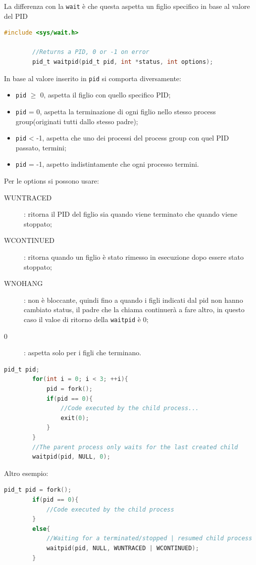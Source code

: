 \documentclass[a4paper, 12pt]{book}
\begin{document}
    La differenza con la \verb|wait| è che questa aspetta un figlio 
    specifico in base al valore del PID
    \begin{lstlisting}[language=C]
        #include <sys/wait.h>

        //Returns a PID, 0 or -1 on error
        pid_t waitpid(pid_t pid, int *status, int options);
    \end{lstlisting}
    In base al valore inserito in \verb|pid| si comporta diversamente:
    \begin{itemize}
        \item \verb|pid| $\ge$ 0, aspetta il figlio con quello specifico PID;
        \item \verb|pid| = 0, aspetta la terminazione di ogni figlio nello stesso process group(originati tutti dallo stesso padre);
        \item \verb|pid| < -1, aspetta che uno dei processi del process group con quel PID passato, termini;
        \item \verb|pid| = -1, aspetto indistintamente che ogni processo termini.
    \end{itemize}
    Per le options si possono usare:
    \begin{description}
        \item[WUNTRACED]: ritorna il PID del figlio sia quando viene terminato che quando viene stoppato;
        \item[WCONTINUED]: ritorna quando un figlio è stato rimesso in esecuzione dopo essere stato stoppato;
        \item[WNOHANG]: non è bloccante, quindi fino a quando i figli indicati dal pid non hanno cambiato status, il padre che la chiama continuerà a fare altro, in questo caso il valoe di ritorno della \verb|waitpid| è 0;
        \item[0]: aspetta solo per i figli che terminano.    
    \end{description}
    \begin{lstlisting}[language=C]
        pid_t pid;
        for(int i = 0; i < 3; ++i){
            pid = fork();
            if(pid == 0){
                //Code executed by the child process... 
                exit(0);
            }
        }
        //The parent process only waits for the last created child 
        waitpid(pid, NULL, 0);
    \end{lstlisting}
    Altro esempio:
    \begin{lstlisting}[language=C]
        pid_t pid = fork();
        if(pid == 0){
            //Code executed by the child process
        }
        else{
            //Waiting for a terminated/stopped | resumed child process 
            waitpid(pid, NULL, WUNTRACED | WCONTINUED);
        }
    \end{lstlisting}
\end{document}
